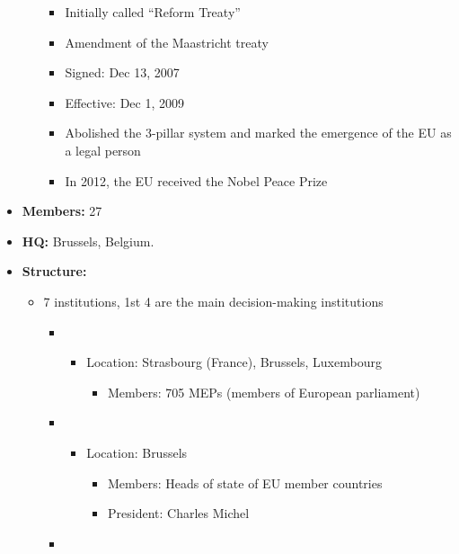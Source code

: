 \documentclass[
  10pt,
  ignorenonframetext,
  progressbar=frametitle]{beamer}
\providecommand{\tightlist}{%
  \setlength{\itemsep}{0pt}\setlength{\parskip}{0pt}}
\begin{document}
\begin{frame}[allowframebreaks]
\begin{itemize}
\begin{itemize}
    \begin{itemize}
    \tightlist
    \item
      Initially called ``Reform Treaty''
    \item
      Amendment of the Maastricht treaty
    \item
      Signed: Dec 13, 2007
    \item
      Effective: Dec 1, 2009
    \item
      Abolished the 3-pillar system and marked the emergence of the EU
      as a legal person
    \item
      In 2012, the EU received the Nobel Peace Prize
    \end{itemize}
  \end{itemize}
\item
  \textbf{Members:} 27
\item
  \textbf{HQ:} Brussels, Belgium.
\item
  \textbf{Structure:}

  \begin{itemize}
  \tightlist
  \item
    7 institutions, 1st 4 are the main decision-making institutions

    \begin{itemize}
    \item

      \begin{itemize}
      \tightlist
      \item
        Location: Strasbourg (France), Brussels, Luxembourg

        \begin{itemize}
        \tightlist
        \item
          Members: 705 MEPs (members of European parliament)
        \end{itemize}
      \end{itemize}
    \item

      \begin{itemize}
      \tightlist
      \item
        Location: Brussels

        \begin{itemize}
        \tightlist
        \item
          Members: Heads of state of EU member countries
        \item
          President: Charles Michel
        \end{itemize}
      \end{itemize}
    \item


\end{itemize}
\end{itemize}
\end{itemize}
\end{frame}
\end{document}
